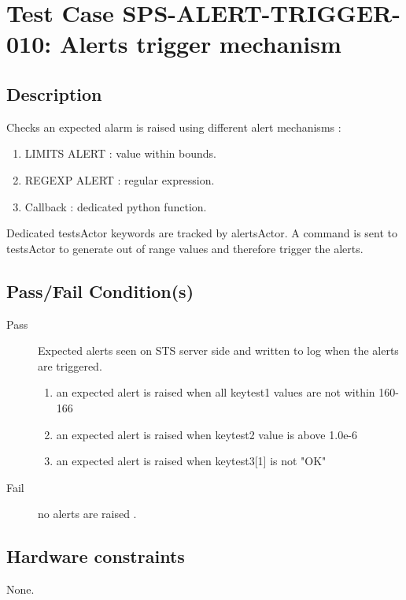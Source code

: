 \section{Test Case SPS-ALERT-TRIGGER-010: Alerts trigger mechanism}

\subsection{Description}

Checks an expected alarm is raised using different alert mechanisms :
\begin{enumerate}
    \item LIMITS ALERT :  value within bounds.
    \item REGEXP ALERT : regular expression.
    \item Callback : dedicated python function.
\end{enumerate}

Dedicated testsActor keywords are tracked by alertsActor.
A command is sent to testsActor to generate out of range values and therefore trigger the alerts.


\subsection{Pass/Fail Condition(s)}

\begin{description}
\item [Pass] Expected alerts seen on STS server side and written to log when the alerts are triggered.

\begin{enumerate}
    \item an expected alert is raised when all keytest1 values are not within 160-166
    \item an expected alert is raised when keytest2 value is above 1.0e-6
    \item an expected alert is raised when keytest3[1] is not "OK"
\end{enumerate}


\item [Fail] no alerts are raised .
\end{description}

\subsection{Hardware constraints}

None.

